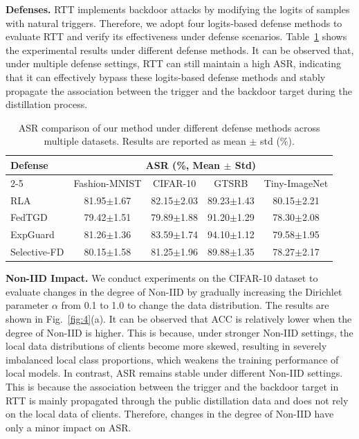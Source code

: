 \documentclass[lettersize,journal]{IEEEtran}
\begin{document}
\textbf{Defenses.}
RTT implements backdoor attacks by modifying the logits of samples with natural triggers.
Therefore, we adopt four logits-based defense methods to evaluate RTT and verify its effectiveness under defense scenarios.
Table~\ref{defense_asr} shows the experimental results under different defense methods.
It can be observed that, under multiple defense settings, RTT can still maintain a high ASR, indicating that it can effectively bypass these logits-based defense methods and stably propagate the association between the trigger and the backdoor target during the distillation process.

\begin{table}[t]
\centering
\caption{ASR comparison of our method under different defense methods across multiple datasets. Results are reported as mean $\pm$ std (\%).}
\renewcommand\arraystretch{1.2}
\setlength{\tabcolsep}{3pt}
\begin{tabular}{lcccc}
\toprule
\multirow{2}{*}{Defense} & \multicolumn{4}{c}{ASR (\%, Mean $\pm$ Std)} \\
\cmidrule(lr){2-5}
& Fashion-MNIST & CIFAR-10 & GTSRB & Tiny-ImageNet \\
\midrule
RLA
& 81.95$\pm$1.67
& 82.15$\pm$2.03
& 89.23$\pm$1.43
& 80.15$\pm$2.21 \\

FedTGD
& 79.42$\pm$1.51
& 79.89$\pm$1.88
& 91.20$\pm$1.29
& 78.30$\pm$2.08 \\

ExpGuard
& 81.26$\pm$1.36
& 83.59$\pm$1.74
& 94.10$\pm$1.12
& 79.58$\pm$1.95 \\

Selective-FD
& 80.15$\pm$1.58
& 81.25$\pm$1.96
& 89.88$\pm$1.35
& 78.27$\pm$2.17 \\
\bottomrule
\end{tabular}
\label{defense_asr}
\end{table}

\textbf{Non-IID Impact.} 
We conduct experiments on the CIFAR-10 dataset to evaluate changes in the degree of Non-IID by gradually increasing the Dirichlet parameter $\alpha$ from 0.1 to 1.0 to change the data distribution.
The results are shown in Fig.~\ref{fig:4}(a).
It can be observed that ACC is relatively lower when the degree of Non-IID is higher.
This is because, under stronger Non-IID settings, the local data distributions of clients become more skewed, resulting in severely imbalanced local class proportions, which weakens the training performance of local models.
In contrast, ASR remains stable under different Non-IID settings.
This is because the association between the trigger and the backdoor target in RTT is mainly propagated through the public distillation data and does not rely on the local data of clients.
Therefore, changes in the degree of Non-IID have only a minor impact on ASR.
\end{document}
